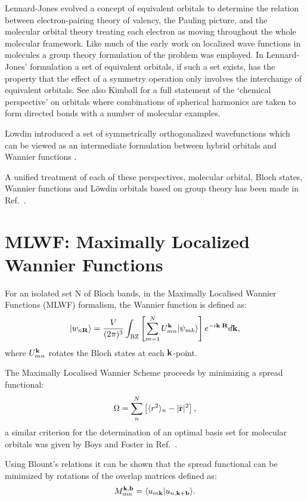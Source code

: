 Lennard-Jones evolved a concept of equivalent 
orbitals \cite{lennardjones49a,lennardjones49b, hall50}
to determine the relation between electron-pairing theory of valency, 
the Pauling picture, and the molecular orbital theory treating each 
electron as moving throughout the whole molecular 
framework. Like much of the early work on localized wave functions in molecules 
a group theory formulation of the problem was employed.
In Lennard-Jones' formulation a set of equivalent orbitals, 
if such a set exists, has the property that the effect of a symmetry 
operation only involves the interchange of equivalent orbitals.
See also Kimball for a full statement of the `chemical perspective' 
on orbitals where combinations of spherical harmonics are taken to form
directed bonds \cite{kimball41} with a number of molecular examples.


Lowdin introduced a set of symmetrically orthogonalized wavefunctions which 
can be viewed as an intermediate formulation between hybrid orbitals 
and Wannier functions \cite{lowdin56}.

A unified treatment of each of these perspectives, molecular orbital,
Bloch states, Wannier functions and L\"owdin orbitals based on group theory 
has been made in Ref.~\cite{altmann58}.

\section{MLWF: Maximally Localized Wannier Functions}
For an isolated set N of Bloch bands, in the Maximally Localised Wannier Functions 
(MLWF) formalism, the Wannier function is defined as:
%
\begin{equation}
|w_{n{\bf R}}\rangle = \frac{V}{(2\pi)^{3}}\int_{\rm BZ} \left[ \sum_{m=1}^{N} U^{{\bf k}}_{mn}|\psi_{mk}\rangle \right]e^{-i{\bf k}\cdot{\bf R}}d{\bf k},
\end{equation}
%
where $U_{mn}^{{\bf k}}$ rotates the Bloch states at each ${\bf k}$-point.

The Maximally Localised Wannier Scheme proceeds by minimizing a spread functional:
%
\begin{equation}
\Omega = \sum_{n}^{N} \left[ \langle r^{2} \rangle_{n} - |\bar{{\bf r}}|^{2} \right],
\end{equation}
%
a similar criterion for the determination of an optimal basis set for
molecular orbitals was given by Boys and Foster in Ref.~\cite{boys60b}.

Using Blount's relations it can be shown that 
the spread functional can be minimized by rotations of the overlap matrices defined as: 
%
\begin{equation}
M_{mn}^{{\bf k},\bf{b}} = \langle u_{m{\bf k}}|u_{n,{\bf k}+\bf{b}} \rangle.
\end{equation}
%

